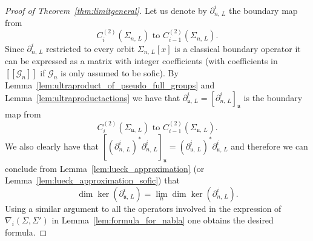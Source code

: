 \documentclass[10pt]{amsart}
\theoremstyle{definition}
\newcommand{\cg}{\mathcal{G}}
\newcommand{\ul}{\mathfrak{u}}
\begin{document}
\begin{proof}[Proof of Theorem~\ref{thm:limitgeneral}]
Let us denote by $\partial_{n,\,L}^i$ the boundary map from
\[
C_{i}^{(2)}\left(\Sigma_{n,\,L}\right)\text{ to }C_{i-1}^{(2)}\left(\Sigma_{n,\,L}\right).
\]
Since $\partial_{n,\,L}^i$ restricted to every orbit $\Sigma_{n,\,L}[x]$ is a classical boundary operator it can be expressed as a matrix with integer coefficients (with coefficients in $[[\cg_n]]$ if $\cg_n$ is only assumed to be sofic). By Lemma~\ref{lem:ultraproduct_of_pseudo_full_groups} and Lemma~\ref{lem:ultraproductactions} we have that $\partial_{\ul,\,L}^i=[\partial_{n,\,L}^i]_\ul$ is the boundary map from
\[
C_{i}^{(2)}(\Sigma_{\ul,\,L})\text{ to }C_{i-1}^{(2)}(\Sigma_{\ul,\,L}).
\]
We also clearly have that $[(\partial_{n,\,L}^i)^*\partial_{n,\,L}^i]_\ul=(\partial_{\ul,\,L}^i)^*\partial_{\ul,\,L}^i$ and therefore we can conclude from Lemma~\ref{lem:lueck_approximation} (or Lemma~\ref{lem:lueck_approximation_sofic}) that
\[
\dim\ker\left(\partial_{\ul,\,L}^i\right) = \lim_n \dim\ker\left(\partial_{n,\,L}^i\right).
\]
Using a similar argument to all the operators involved in the expression of $ \nabla_i(\Sigma,\Sigma')$ in Lemma~\ref{lem:formula_for_nabla} one obtains the desired formula.
\end{proof}
\end{document}
